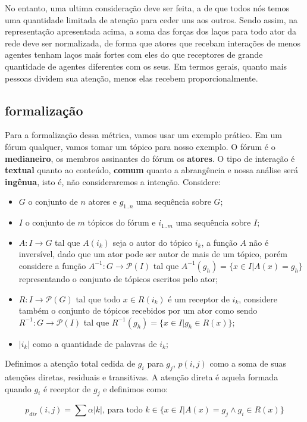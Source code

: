 \documentclass{article}
\begin{document}
No entanto, uma ultima consideração deve ser feita, a de que todos nós temos uma
quantidade limitada de atenção para ceder uns aos outros. Sendo assim, na
representação apresentada acima, a soma das forças dos laços para todo ator da
rede deve ser normalizada, de forma que atores que recebam interações de menos
agentes tenham laços mais fortes com eles do que receptores de grande quantidade
de agentes diferentes com os seus. Em termos gerais, quanto mais pessoas dividem
sua atenção, menos elas recebem proporcionalmente.

\subsection{formalização}
\label{sec:formalizacao}
Para a formalização dessa métrica, vamos usar um exemplo prático. Em um fórum
qualquer, vamos tomar um tópico para nosso exemplo. O fórum é o
\textbf{medianeiro}, os membros assinantes do fórum os \textbf{atores}. O tipo
de interação é \textbf{textual} quanto ao conteúdo, \textbf{comum} quanto a
abrangência e nossa análise será \textbf{ingênua}, isto é, não consideraremos a
intenção. Considere:
\begin{itemize}
  \item $G$ o conjunto de $n$ atores e $g_{1..n}$ uma sequência sobre $G$;
  \item $I$ o conjunto de $m$ tópicos do fórum e $i_{1..m}$ uma sequência sobre
  $I$;
  \item $A:I\to G$ tal que $A(i_k)$ seja o autor do tópico $i_k$, a função $A$
  não é inversível, dado que um ator pode ser autor de mais de um tópico, porém
  considere a função $A^{-1}:G\to \mathcal{P}(I)$ tal que $A^{-1}(g_h) = \{x \in
  I|A(x) = g_h\}$ representando o conjunto de tópicos escritos pelo ator;
  \item $R:I\to \mathcal{P}(G)$ tal que todo $x \in R(i_k)$ é um receptor de
  $i_k$, considere também o conjunto de tópicos recebidos por um ator como sendo
  $R^{-1}:G\to \mathcal{P}(I)$ tal que $R^{-1}(g_h) = \{x \in I|g_h\in R(x)\}$;
  \item $|i_k|$ como a quantidade de palavras de $i_k$; 
\end{itemize}

Definimos a atenção total cedida de $g_i$ para $g_j$, $p(i,j)$ como a soma de
suas atenções diretas, residuais e transitivas. A atenção direta é aquela
formada quando $g_i$ é receptor de $g_j$ e definimos como:

\begin{equation}
\label{def:atedireta}
p_{dir}(i,j) = \sum \alpha |k|\text{, para todo $k \in \{x \in I| A(x)=g_j
\wedge g_i \in R(x)\}$}
\end{equation}
\end{document}
